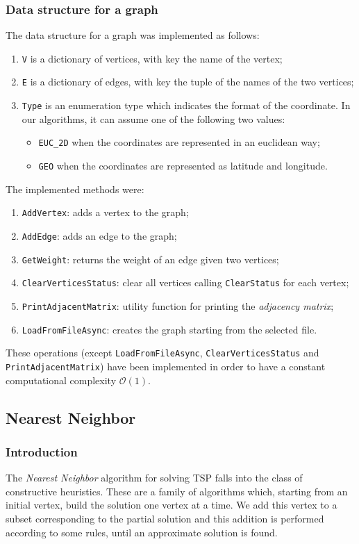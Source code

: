 \subsubsection{Data structure for a graph}
The data structure for a graph was implemented as follows:
\begin{enumerate}
    \item \verb|V| is a dictionary of vertices, with key the name of the vertex;
    \item \verb|E| is a dictionary of edges, with key the tuple of the names of the two vertices;
    \item \verb|Type| is an enumeration type which indicates the format of the coordinate. In our algorithms, it can assume one of the following two values:
    \begin{itemize}
        \item \verb|EUC_2D| when the coordinates are represented in an euclidean way;
        \item \verb|GEO| when the coordinates are represented as latitude and longitude.
    \end{itemize}
\end{enumerate}
\noindent
The implemented methods were:
\begin{enumerate}
    \item \verb|AddVertex|: adds a vertex to the graph;
    \item \verb|AddEdge|: adds an edge to the graph;
    \item \verb|GetWeight|: returns the weight of an edge given two vertices;
    \item \verb|ClearVerticesStatus|: clear all vertices calling \verb|ClearStatus| for each vertex;
    \item \verb|PrintAdjacentMatrix|: utility function for printing the \textit{adjacency matrix};
    \item \verb|LoadFromFileAsync|: creates the graph starting from the selected file.
\end{enumerate}
These operations (except \verb|LoadFromFileAsync|, \verb|ClearVerticesStatus| and \verb|PrintAdjacentMatrix|) have been implemented in order to have a constant computational complexity $\mathcal{O}(1)$.

\subsection{Nearest Neighbor}

\subsubsection{Introduction}
The \textit{Nearest Neighbor} algorithm for solving TSP falls into the class of constructive heuristics. These are a family of algorithms which, starting from an initial vertex, build the solution one vertex at a time. We add this vertex to a subset corresponding to the partial solution and this addition is performed according to some rules, until an approximate solution is found.

